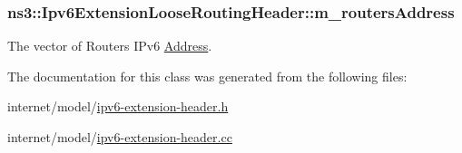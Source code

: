 \subsubsection[{\texorpdfstring{m\+\_\+routers\+Address}{m_routersAddress}}]{ ns3\+::\+Ipv6\+Extension\+Loose\+Routing\+Header\+::m\+\_\+routers\+Address\hspace{0.3cm}{\ttfamily [private]}}\hypertarget{classns3_1_1Ipv6ExtensionLooseRoutingHeader_a9bf9a391edb4d0e136ec2b46e3209e96}{}\label{classns3_1_1Ipv6ExtensionLooseRoutingHeader_a9bf9a391edb4d0e136ec2b46e3209e96}


The vector of Routers\textquotesingle{} I\+Pv6 \hyperlink{classns3_1_1Address}{Address}. 



The documentation for this class was generated from the following files\+:\begin{DoxyCompactItemize}
\item 
internet/model/\hyperlink{ipv6-extension-header_8h}{ipv6-\/extension-\/header.\+h}\item 
internet/model/\hyperlink{ipv6-extension-header_8cc}{ipv6-\/extension-\/header.\+cc}\end{DoxyCompactItemize}
